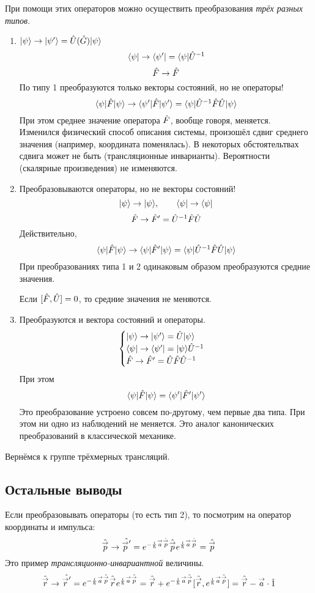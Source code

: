 При помощи этих операторов можно осуществить преобразования \emph{трёх разных типов}. 
\begin{enumerate}
  \item $\qu \psi \to \qu{\psi'} = \hat U(\hat G) \qu \psi$
  $$
    \uq{\psi} \to \uq{\psi'} = \uq \psi \Hat U^{-1}
  $$
  $$
    \Hat F \to \Hat F
  $$
  По типу 1 преобразуются только векторы состояний, но не операторы!
  $$
    \qtri{\psi}{\Hat F}{\psi} \to \qtri{\psi'}{\Hat F}{\psi'} = \qtri{\psi}{\hat U^{-1}\Hat F\Hat U}{\psi} 
  $$
  При этом среднее значение оператора $\Hat F$, вообще говоря, меняется. Изменился физический способ описания системы, произошёл сдвиг среднего значения (например, координата поменялась). В некоторых обстоятельтвах сдвига может не быть (трансляционные инварианты). Вероятности (скалярные произведения) не изменяются.
  \item Преобразовываются операторы, но не векторы состояний!
  $$
    \qu \psi \to \qu \psi, \qquad \uq \psi \to \uq \psi
  $$
  $$
    \hat F \to \Hat F' = \Hat U^{-1} \Hat F \Hat U
  $$
  Действительно,
  $$
    \qtri{\psi}{\hat F}{\psi} \to \qtri{\psi}{\hat F'}{\psi} = \qtri{\psi}{\Hat U^{-1}\hat F\hat U}{\psi}
  $$
  При преобразованиях типа 1 и 2 одинаковым образом преобразуются средние значения.
  
  \Rem Если $[\Hat F, \Hat U] = 0$, то средние значения не меняются.
  \item Преобразуются и вектора состояний и операторы.
  $$
    \begin{cases}
        \qu \psi \to \qu{\psi'} = \Hat U \qu \psi\\
        \uq \psi \to \uq{\psi'} = \qu \psi \Hat U^{-1}\\        
        \Hat F \to \hat F' = \Hat U \Hat F \Hat U^{-1}
    \end{cases}
  $$
  При этом
  $$
    \qtri{\psi}{\Hat F}{\psi} = \qtri{\psi'}{\Hat F'}{\psi'}
  $$
  Это преобразование устроено совсем по-другому, чем первые два типа. При этом ни одно из наблюдений не меняется. Это аналог канонических преобразований в классической механике. 
\end{enumerate}
Вернёмся к группе трёхмерных трансляций.

\subsection{Остальные выводы}
Если преобразовывать операторы (то есть тип 2), то посмотрим на оператор координаты и импульса:
$$
    \Hat{\vec p} \to \hat{\vec p'} = e^{-\frac{i}{\hbar} \vec a \hat{\vec p}} \hat{\vec p} e^{\frac{i}{\hbar} \vec a \hat{\vec p}} = \hat {\vec p}
$$
Это пример \emph{трансляционно-инвариантной} величины.
$$
    \Hat{\vec r} \to \Hat{\vec r'} = e^{-\frac{i}{\hbar} \vec a \hat{\vec p}} \hat{\vec r} e^{\frac{i}{\hbar} \vec a \hat{\vec p}} = \Hat{\vec r} + e^{-\frac{i}{\hbar} \vec a \hat{\vec p}} [\Hat{\vec r}, e^{\frac{i}{\hbar} \vec a \hat{\vec p}}]
    = \Hat{\vec r} - \vec a \cdot \Hat 1
$$
